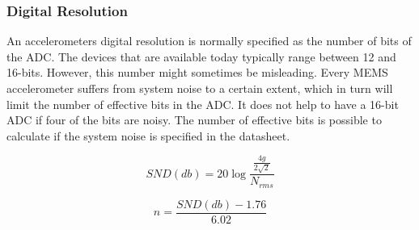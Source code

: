 \subsubsection{Digital Resolution}

An accelerometers digital resolution is normally specified as the number of bits of the ADC. The devices that are available today typically range between 12 and 16-bits. However, this number might sometimes be misleading. Every MEMS accelerometer suffers from system noise to a certain extent, which in turn will limit the number of effective bits in the ADC. It does not help to have a 16-bit ADC if four of the bits are noisy. The number of effective bits is possible to calculate if the system noise is specified in the datasheet.

\begin{equation}
SND(db) = 20\log{\frac{\frac{4g}{2\sqrt{2}}}{N_{rms}}}
\end{equation}

\begin{equation}
n = \frac{SND(db)-1.76}{6.02}
\end{equation}